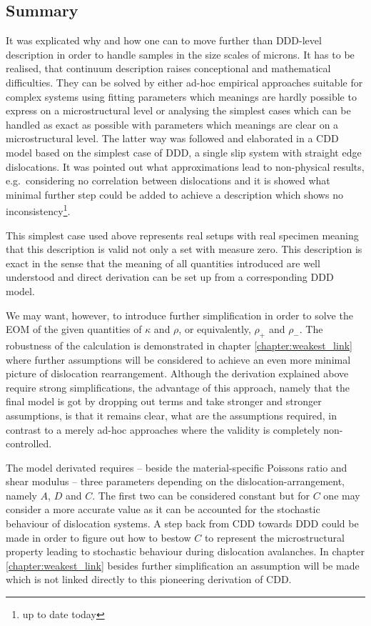 \subsection*{Summary}
It was explicated why and how one can to move further than DDD-level description in order to handle samples in the size scales of microns. It has to be realised, that continuum description raises conceptional and mathematical difficulties. They can be solved by either ad-hoc empirical approaches suitable for complex systems using fitting parameters which meanings are hardly possible to express on a microstructural level or analysing the simplest cases which can be handled as exact as possible with parameters which meanings are clear on a microstructural level. The latter way was followed and elaborated in a CDD model based on the simplest case of DDD, a single slip system with straight edge dislocations. It was pointed out what approximations lead to non-physical results, e.g.\ considering no correlation between dislocations and it is showed what minimal further step could be added to achieve a description which shows no inconsistency\footnote{up to date today}.

This simplest case used above represents real setups with real specimen meaning that this description is valid not only a set with measure zero. This description is exact in the sense that the meaning of all quantities introduced are well understood and direct derivation can be set up from a corresponding DDD model.

We may want, however, to introduce further simplification in order to solve the EOM of the given quantities of $\kappa$ and $\rho$, or equivalently, $\rho_+$ and $\rho_-$. The robustness of the calculation is demonstrated in chapter \ref{chapter:weakest_link} where further assumptions will be considered to achieve an even more minimal picture of dislocation rearrangement. Although the derivation explained above require strong simplifications, the advantage of this approach, namely that the final model is got by dropping out terms and take stronger and stronger assumptions, is that it remains clear, what are the assumptions required, in contrast to a merely ad-hoc approaches where the validity is completely non-controlled.

The model derivated requires -- beside the material-specific Poissons ratio and shear modulus -- three parameters depending on the dislocation-arrangement, namely $A$, $D$ and $C$. The first two can be considered constant but for $C$ one may consider a more accurate value as it can be accounted for the stochastic behaviour of dislocation systems. A step back from CDD towards DDD could be made in order to figure out how to bestow $C$ to represent the microstructural property leading to stochastic behaviour during dislocation avalanches. In chapter \ref{chapter:weakest_link} besides further simplification an assumption will be made which is not linked directly to this pioneering derivation of CDD.
